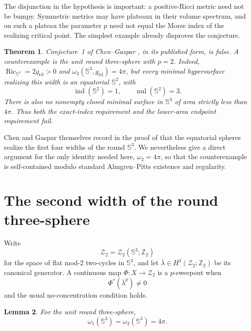 \documentclass[11pt]{article}
\newtheorem{theorem}{Theorem}
\newtheorem{lemma}[theorem]{Lemma}
\theoremstyle{remark}
\newcommand{\Sph}{\mathbb S}
\newcommand{\Ztwo}{\mathbb Z_2}
\newcommand{\ind}{\operatorname{ind}}
\newcommand{\nul}{\operatorname{nul}}
\newcommand{\Ric}{\operatorname{Ric}}
\begin{document}
The disjunction in the hypothesis is important: a positive-Ricci metric
need not be bumpy.  Symmetric metrics may have plateaux in their volume
spectrum, and on such a plateau the parameter $p$ need not equal the
Morse index of the realizing critical point.  The simplest example
already disproves the conjecture.

\begin{theorem}\label{thm:main}
Conjecture~1 of Chen--Gaspar \cite{ChenGaspar}, in its published form, is
false.  A counterexample is the unit round three-sphere with $p=2$.
Indeed, $\Ric_{\Sph^3}=2g_{\mathrm{rd}}>0$ and
$\omega_2(\Sph^3,g_{\mathrm{rd}})=4\pi$, but every minimal hypersurface
realizing this width is an equatorial $\Sph^2$, with
\[
  \ind(\Sph^2)=1,
  \qquad
  \nul(\Sph^2)=3.
\]
There is also no nonempty closed minimal surface in $\Sph^3$ of area
strictly less than $4\pi$.  Thus both the exact-index requirement and the
lower-area endpoint requirement fail.
\end{theorem}

Chen and Gaspar themselves record in the proof of
\cite[Proposition~1]{ChenGaspar} that the equatorial spheres realize the
first four widths of the round $\Sph^3$.  We nevertheless give a direct
argument for the only identity needed here, $\omega_2=4\pi$, so that the
counterexample is self-contained modulo standard Almgren--Pitts
existence and regularity.

\section{The second width of the round three-sphere}

Write
\[
  \mathcal Z_2=\mathcal Z_2(\Sph^3;\Ztwo)
\]
for the space of flat mod-$2$ two-cycles in $\Sph^3$, and let
$\bar\lambda\in H^1(\mathcal Z_2;\Ztwo)$ be its canonical generator.  A
continuous map $\Phi:X\to\mathcal Z_2$ is a $p$-sweepout when
\[
  \Phi^*(\bar\lambda^p)\neq0
\]
and the usual no-concentration condition holds.

\begin{lemma}\label{lem:width}
For the unit round three-sphere,
\[
  \omega_1(\Sph^3)=\omega_2(\Sph^3)=4\pi.
\]
\end{lemma}
\end{document}
